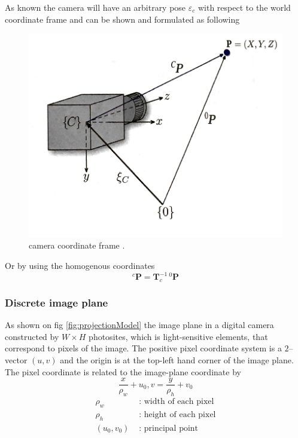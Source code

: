 \documentclass[journal,final,a4paper,twoside]{PS}
\begin{document}
As known the camera will have an arbitrary pose $\varepsilon_c$ with respect to the world coordinate frame and can be shown and formulated as following 
\begin{figure}[h]
\begin{center}
\includegraphics[scale=0.3]{./pics/cameraCoordinateFrame.png}
\caption{camera coordinate frame \cite{Corke}.}
\label{fig:cameraFrame}
\end{center}
\end{figure}

Or by using the homogenous coordinates 
\begin{equation}
{}^{c}\textbf{P}=\textbf{T}_c^{-1}\, {}^{0}\textbf{P}
\end{equation}

\subsubsection{Discrete image plane}
As shown on fig \ref{fig:projectionModel} the image plane in a digital camera constructed by $ W\times H $ photosites, which is light-sensitive elements, that correspond to pixels of the image.  The positive pixel coordinate system is a $2$--vector $(u,v)$ and the origin is at the top-left hand corner of the image plane.
The pixel coordinate is related to the image-plane coordinate by
\begin{equation}\frac{x}{\rho_w} + u_0, v = \frac{y}{\rho_h}+v_0\end{equation}
\begin{align*}
\rho_w&\text{ :  width of each pixel}\\
\rho_h&\text{  :  height of each pixel}\\
(u_0,v_0)&\text{  :  principal point}
\end{align*}
\end{document}
